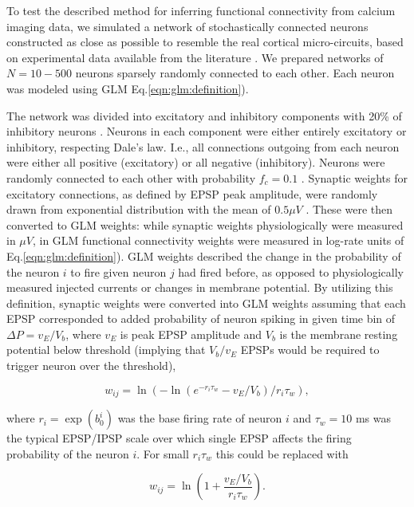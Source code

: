 To test the described method for inferring functional connectivity from calcium imaging data, we simulated a network of stochastically connected neurons constructed as close as possible to resemble the real cortical micro-circuits, based on experimental data available from the literature \cite{Braitenberg1998, Urquijo2000, Lefort2009, Sayer1990}.  We prepared networks of $N=10-500$ neurons sparsely randomly connected to each other. Each neuron was modeled using GLM Eq.\eqref{eqn:glm:definition}).

The network was divided into excitatory and inhibitory components with 20\% of inhibitory neurons \cite{Braitenberg1998, Urquijo2000}.  Neurons in each component were either entirely excitatory or inhibitory, respecting Dale's law. I.e., all connections outgoing from each neuron were either all positive (excitatory) or all negative (inhibitory). Neurons were randomly connected to each other with probability $f_c=0.1$ \cite{Braitenberg1998, Lefort2009}.  Synaptic weights for excitatory connections, as defined by EPSP peak amplitude, were randomly drawn from exponential distribution with the mean of $0.5 \mu V$ \cite{Lefort2009, Sayer1990}. These were then converted to GLM weights: while synaptic weights physiologically were measured in $\mu V$, in GLM functional connectivity weights were measured in log-rate units of Eq.\eqref{eqn:glm:definition}). GLM weights described the change in the probability of the neuron $i$ to fire given neuron $j$ had fired before, as opposed to physiologically measured injected currents or changes in membrane potential. By utilizing this definition, synaptic weights were converted into GLM weights assuming that each EPSP corresponded to added probability of neuron spiking in given time bin of $\Delta P = v_{E}/V_{b}$, where $v_E$ is peak EPSP amplitude and $V_b$ is the membrane resting potential below threshold (implying that $V_{b}/v_{E}$ EPSPs would be required to trigger neuron over the threshold), 

\begin{equation}\label{eqn:convert}
w_{ij}=\ln(-\ln(e^{-r_i\tau_w}-v_{E}/V_{b})/r_i\tau_w), 
\end{equation}

where $r_i=\exp(b^i_0)$ was the base firing rate of neuron $i$ and $\tau_w=10$ ms was the typical EPSP/IPSP scale over which single EPSP affects the firing probability of the neuron $i$.  For small $r_i\tau_w$ this could be replaced with

\begin{equation}\label{eqn:convert-smalldt}
w_{ij}=\ln\left(1+\frac{v_{E}/V_{b}}{r_i\tau_w}\right).
\end{equation}

